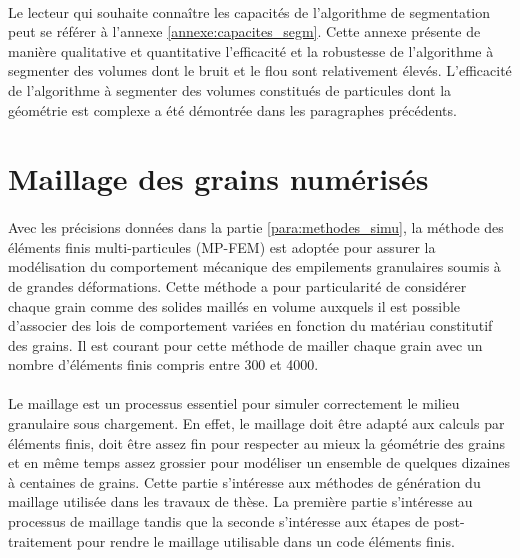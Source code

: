 	\paragraph{}
		Le lecteur qui souhaite connaître les capacités de l'algorithme de segmentation peut se référer à l'annexe \ref{annexe:capacites_segm}. Cette annexe présente de manière qualitative et quantitative l'efficacité et la robustesse de l'algorithme à segmenter des volumes dont le bruit et le flou sont relativement élevés. L'efficacité de l'algorithme à segmenter des volumes constitués de particules dont la géométrie est complexe a été démontrée dans les paragraphes précédents.

\section{Maillage des grains numérisés}\label{para05:maillage}
	\paragraph{}
	Avec les précisions données dans la partie \ref{para:methodes_simu}, la méthode des éléments finis multi-particules (MP-FEM) est adoptée pour assurer la modélisation du comportement mécanique des empilements granulaires soumis à de grandes déformations. Cette méthode a pour particularité de considérer chaque grain comme des solides maillés en volume auxquels il est possible d’associer des lois de comportement variées en fonction du matériau constitutif des grains. Il est courant pour cette méthode de mailler chaque grain avec un nombre d’éléments finis compris entre \num{300} et \num{4000}.
	\paragraph{}
	Le maillage est un processus essentiel pour simuler correctement le milieu granulaire sous chargement. En effet, le maillage doit être adapté aux calculs par éléments finis, doit être assez fin pour respecter au mieux la géométrie des grains et en même temps assez grossier pour modéliser un ensemble de quelques dizaines à centaines de grains. Cette partie s'intéresse aux méthodes de génération du maillage utilisée dans les travaux de thèse. La première partie s'intéresse au processus de maillage tandis que la seconde s'intéresse aux étapes de post-traitement pour rendre le maillage utilisable dans un code éléments finis.
